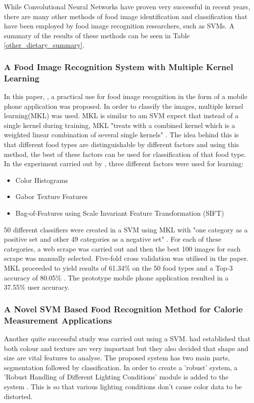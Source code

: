 While Convolutional Neural Networks have proven very successful in recent years, there are many other methods of food image identification and classification that have been employed by food image recognition researchers, such as SVMs.
A summary of the results of these methods can be seen in Table \ref{other_dietary_summary}.

\subsubsection*{A Food Image Recognition System with Multiple Kernel Learning}
In this paper, \parencite{kernelLearning}, a practical use for food image recognition in the form of a mobile phone application was proposed. In order to classify the images, multiple kernel learning(MKL) was used. MKL is similar to am SVM expect that instead of a single kernel during training, MKL "treats with a combined kernel which is a weighted linear combination of several single kernels" \parencite{kernelLearning}. The idea behind this is that different food types are distinguishable by different factors and using this method, the best of these factors can be used for classification of that food type. In the experiment carried out by \parencite{kernelLearning}, three different factors were used for learning:
\begin{itemize}
	\item{Color Histograms}
	\item{Gabor Texture Features}
	\item{Bag-of-Features using Scale Invariant Feature Transformation (SIFT)}
\end{itemize}

50 different classifiers were created in a SVM using MKL with "one category as a positive set and other 49 categories as a negative set" \parencite{kernelLearning}. For each of these categories, a web scrape was carried out and then the best 100 images for each scrape was manually selected. Five-fold cross validation was utilised in the paper. MKL proceeded to yield results of 61.34\% on the 50 food types and a Top-3 accuracy of 80.05\% \parencite{kernelLearning}. The prototype mobile phone application resulted in a 37.55\% user accuracy.

\subsubsection*{A Novel SVM Based Food Recognition Method for Calorie Measurement Applications}
Another quite successful study was carried out using a SVM. \parencite{novelSVM} had established that both colour and texture are very important but they also decided that shape and size are vital features to analyse. The proposed system has two main parts, segmentation followed by classification. In order to create a 'robust' system, a 'Robust Handling of Different Lighting Conditions' module is added to the system \parencite{novelSVM}. This is so that various lighting conditions don't cause color data to be distorted. 

